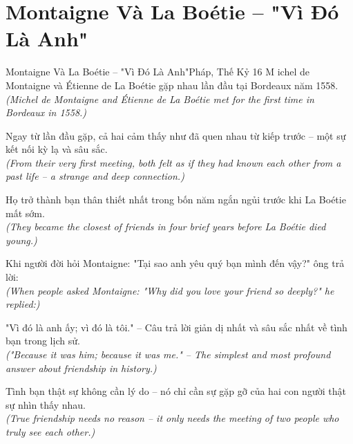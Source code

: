 \section{Montaigne Và La Boétie -- "Vì Đó Là Anh"}
\begin{truyen}{Montaigne Và La Boétie -- "Vì Đó Là Anh"}{Pháp, Thế Kỷ 16}
M ichel de Montaigne và Étienne de La Boétie gặp nhau lần đầu tại Bordeaux năm 1558.\\
\textit{(Michel de Montaigne and Étienne de La Boétie met for the first time in Bordeaux in 1558.)}

Ngay từ lần đầu gặp, cả hai cảm thấy như đã quen nhau từ kiếp trước -- một sự kết nối kỳ lạ và sâu sắc.\\
\textit{(From their very first meeting, both felt as if they had known each other from a past life -- a strange and deep connection.)}

Họ trở thành bạn thân thiết nhất trong bốn năm ngắn ngủi trước khi La Boétie mất sớm.\\
\textit{(They became the closest of friends in four brief years before La Boétie died young.)}

Khi người đời hỏi Montaigne: "Tại sao anh yêu quý bạn mình đến vậy?" ông trả lời:\\
\textit{(When people asked Montaigne: "Why did you love your friend so deeply?" he replied:)}

"Vì đó là anh ấy; vì đó là tôi." -- Câu trả lời giản dị nhất và sâu sắc nhất về tình bạn trong lịch sử.\\
\textit{("Because it was him; because it was me." -- The simplest and most profound answer about friendship in history.)}

\end{truyen}
\begin{baihoc}
  Tình bạn thật sự không cần lý do -- nó chỉ cần sự gặp gỡ của hai con người thật sự nhìn thấy nhau.\\
  \textit{(True friendship needs no reason -- it only needs the meeting of two people who truly see each other.)}
\end{baihoc}

